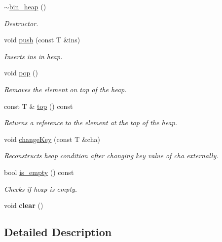 \begin{DoxyCompactItemize}
\mbox{\hyperlink{classbin__heap_a5283db56783a84ee28dea9d393acf905}{$\sim$bin\+\_\+heap}} ()
\begin{DoxyCompactList}\small\item\em Destructor. \end{DoxyCompactList}\item 
void \mbox{\hyperlink{classbin__heap_a6d658d61533e66cf83dce2f8e35bed17}{push}} (const T \&ins)
\begin{DoxyCompactList}\small\item\em Inserts {\ttfamily ins} in heap. \end{DoxyCompactList}\item 
\mbox{\label{classbin__heap_ab463bc655b2f46cd5ff021cab28b1210}} 
void \mbox{\hyperlink{classbin__heap_ab463bc655b2f46cd5ff021cab28b1210}{pop}} ()
\begin{DoxyCompactList}\small\item\em Removes the element on top of the heap. \end{DoxyCompactList}\item 
const T \& \mbox{\hyperlink{classbin__heap_acd711ddeafe82630f153906da7e8fa1c}{top}} () const
\begin{DoxyCompactList}\small\item\em Returns a reference to the element at the top of the heap. \end{DoxyCompactList}\item 
void \mbox{\hyperlink{classbin__heap_ab1353fe40c5cfc1205314a4db6334f1b}{change\+Key}} (const T \&cha)
\begin{DoxyCompactList}\small\item\em Reconstructs heap condition after changing key value of {\ttfamily cha} externally. \end{DoxyCompactList}\item 
bool \mbox{\hyperlink{classbin__heap_a2bbb9cf5cc5cda265c8603c561b796a5}{is\+\_\+empty}} () const
\begin{DoxyCompactList}\small\item\em Checks if heap is empty. \end{DoxyCompactList}\item 
\mbox{\label{classbin__heap_abf7a6189fcb48e435fc156f764e38f1d}} 
void {\bfseries clear} ()
\end{DoxyCompactItemize}


\subsection{Detailed Description}
